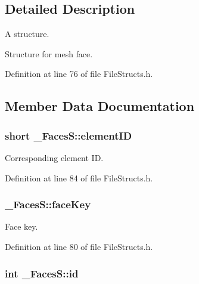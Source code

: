 \subsection{Detailed Description}
A structure. 

Structure for mesh face. 

Definition at line 76 of file File\+Structs.\+h.



\subsection{Member Data Documentation}
\subsubsection[{\texorpdfstring{element\+ID}{elementID}}]{\setlength{\rightskip}{0pt plus 5cm}short \+\_\+\+Faces\+S\+::element\+ID}\hypertarget{struct___faces_s_a430ed7b14ef236bea40b0a9be2801c94}{}\label{struct___faces_s_a430ed7b14ef236bea40b0a9be2801c94}


Corresponding element ID. 



Definition at line 84 of file File\+Structs.\+h.

\subsubsection[{\texorpdfstring{face\+Key}{faceKey}}]{ \+\_\+\+Faces\+S\+::face\+Key}\hypertarget{struct___faces_s_a0b72e5930902a49f376d035d654ecef8}{}\label{struct___faces_s_a0b72e5930902a49f376d035d654ecef8}


Face key. 



Definition at line 80 of file File\+Structs.\+h.

\subsubsection[{\texorpdfstring{id}{id}}]{\setlength{\rightskip}{0pt plus 5cm}int \+\_\+\+Faces\+S\+::id}\hypertarget{struct___faces_s_a7365ff5c5951b2a61ef5e4411b0d521a}{}\label{struct___faces_s_a7365ff5c5951b2a61ef5e4411b0d521a}


